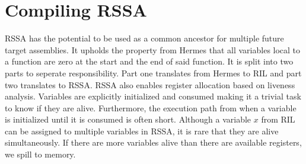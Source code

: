 \section{Compiling RSSA}
RSSA has the potential to be used as a common ancestor for multiple future target assemblies.
It upholds the property from Hermes that all variables local to a function are zero at the start and the end of said function.
It is split into two parts to seperate responsibility.
Part one translates from Hermes to RIL and part two translates to RSSA.
RSSA also enables register allocation based on liveness analysis.
Variables are explicitly initialized and consumed making it a trivial task to know if they are alive.
Furthermore, the execution path from when a variable is initialized until it is consumed is often short.
Although a variable $x$ from RIL can be assigned to multiple variables in RSSA, it is rare that they are alive simultaneously.
If there are more variables alive than there are available registers, we spill to memory.


